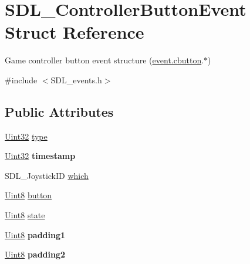 \hypertarget{structSDL__ControllerButtonEvent}{}\section{S\+D\+L\+\_\+\+Controller\+Button\+Event Struct Reference}
\label{structSDL__ControllerButtonEvent}


Game controller button event structure (\hyperlink{unionSDL__Event_aee2b5671c8dcdb447023715cc21593cb}{event.\+cbutton}.$\ast$)  




{\ttfamily \#include $<$S\+D\+L\+\_\+events.\+h$>$}

\subsection*{Public Attributes}
\begin{DoxyCompactItemize}
\item 
\hyperlink{SDL__stdinc_8h_add440eff171ea5f55cb00c4a9ab8672d}{Uint32} \hyperlink{structSDL__ControllerButtonEvent_a09869d792031e47a88673d85915c209f}{type}
\item 
\hypertarget{structSDL__ControllerButtonEvent_a73003712734c4d2f966db3d7c2ce826b}{}\hyperlink{SDL__stdinc_8h_add440eff171ea5f55cb00c4a9ab8672d}{Uint32} {\bfseries timestamp}\label{structSDL__ControllerButtonEvent_a73003712734c4d2f966db3d7c2ce826b}

\item 
S\+D\+L\+\_\+\+Joystick\+I\+D \hyperlink{structSDL__ControllerButtonEvent_a98777e88b5d5cae83eef16ffd4bcacc1}{which}
\item 
\hyperlink{SDL__stdinc_8h_a2944638813a090aa23e62f4da842c3e2}{Uint8} \hyperlink{structSDL__ControllerButtonEvent_a039da6cd31c3c62e62a3ae17cc64d0db}{button}
\item 
\hyperlink{SDL__stdinc_8h_a2944638813a090aa23e62f4da842c3e2}{Uint8} \hyperlink{structSDL__ControllerButtonEvent_a00c46683f86674c2a4f74404ee3e857c}{state}
\item 
\hypertarget{structSDL__ControllerButtonEvent_a34d3e43fc1994288b9b083c874bc0899}{}\hyperlink{SDL__stdinc_8h_a2944638813a090aa23e62f4da842c3e2}{Uint8} {\bfseries padding1}\label{structSDL__ControllerButtonEvent_a34d3e43fc1994288b9b083c874bc0899}

\item 
\hypertarget{structSDL__ControllerButtonEvent_a8caf56a3921227913cfb652d5de1eec4}{}\hyperlink{SDL__stdinc_8h_a2944638813a090aa23e62f4da842c3e2}{Uint8} {\bfseries padding2}\label{structSDL__ControllerButtonEvent_a8caf56a3921227913cfb652d5de1eec4}

\end{DoxyCompactItemize}


